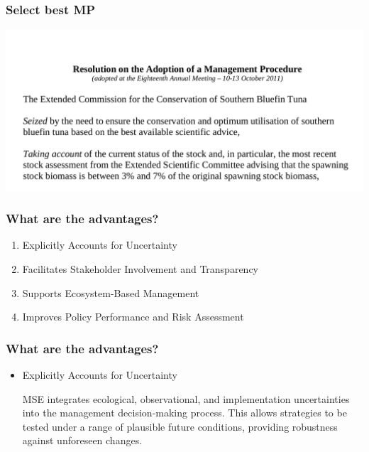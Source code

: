 \documentclass{beamer}
\begin{document}
\begin{frame}
\begin{columns}[c]
	\end{columns}
	
\end{frame}

\begin{frame}
\frametitle{Select best MP}

\begin{center}
\includegraphics[height=0.6\textheight]{figs/mp.png}
\end{center}

\end{frame}

\begin{frame}
	\frametitle{What are the advantages?}
	
	\begin{enumerate}
		\item Explicitly Accounts for Uncertainty
		\item Facilitates Stakeholder Involvement and Transparency
		\item Supports Ecosystem-Based Management
		\item Improves Policy Performance and Risk Assessment
	\end{enumerate}
	
\end{frame}


\begin{frame}
\frametitle{What are the advantages?}

\begin{itemize}
	\item Explicitly Accounts for Uncertainty \\ 
	
	\bigskip

	MSE integrates ecological, observational, and implementation uncertainties into the management decision-making process. This allows strategies to be tested under a range of plausible future conditions, providing robustness against unforeseen changes.
\end{itemize}

\end{frame}
\end{document}
